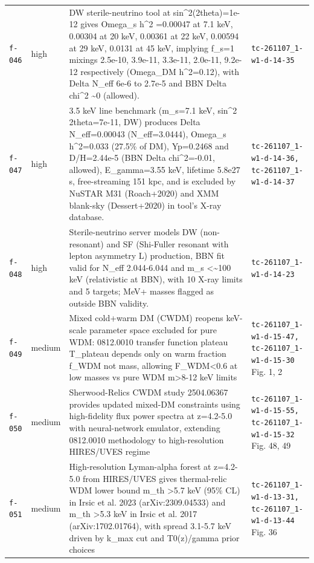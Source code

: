 \documentclass[11pt,a4paper]{article}
\begin{document}
\begin{longtable}{@{}p{}p{}p{}p{}@{}}
\texttt{f-046} & high & DW sterile-neutrino tool at sin\textasciicircum{}2(2theta)=1e-12 gives Omega\_s h\textasciicircum{}2 =0.00047 at 7.1 keV, 0.00304 at 20 keV, 0.00361 at 22 keV, 0.00594 at 29 keV, 0.0131 at 45 keV, implying f\_s=1 mixings 2.5e-10, 3.9e-11, 3.3e-11, 2.0e-11, 9.2e-12 respectively (Omega\_DM h\textasciicircum{}2=0.12), with Delta N\_eff 6e-6 to 2.7e-5 and BBN Delta chi\textasciicircum{}2 \textasciitilde{}0 (allowed). & \texttt{tc-261107\_\allowbreak{}1-w1-d-14-35} \\
\texttt{f-047} & high & 3.5 keV line benchmark (m\_s=7.1 keV, sin\textasciicircum{}2 2theta=7e-11, DW) produces Delta N\_eff=0.00043 (N\_eff=3.0444), Omega\_s h\textasciicircum{}2=0.033 (27.5\% of DM), Yp=0.2468 and D/H=2.44e-5 (BBN Delta chi\textasciicircum{}2=-0.01, allowed), E\_gamma=3.55 keV, lifetime 5.8e27 s, free-streaming 151 kpc, and is excluded by NuSTAR M31 (Roach+2020) and XMM blank-sky (Dessert+2020) in tool's X-ray database. & \texttt{tc-261107\_\allowbreak{}1-w1-d-14-36,\allowbreak{} tc-261107\_\allowbreak{}1-w1-d-14-37} \\
\texttt{f-048} & high & Sterile-neutrino server models DW (non-resonant) and SF (Shi-Fuller resonant with lepton asymmetry L) production, BBN fit valid for N\_eff 2.044-6.044 and m\_s \textless{}\textasciitilde{}100 keV (relativistic at BBN), with 10 X-ray limits and 5 targets; MeV+ masses flagged as outside BBN validity. & \texttt{tc-261107\_\allowbreak{}1-w1-d-14-23} \\
\texttt{f-049} & medium & Mixed cold+warm DM (CWDM) reopens keV-scale parameter space excluded for pure WDM: 0812.0010 transfer function plateau T\_plateau depends only on warm fraction f\_WDM not mass, allowing F\_WDM\textless{}0.6 at low masses vs pure WDM m\textgreater{}8-12 keV limits & \texttt{tc-261107\_\allowbreak{}1-w1-d-15-47,\allowbreak{} tc-261107\_\allowbreak{}1-w1-d-15-30} Fig. 1, 2 \\
\texttt{f-050} & medium & Sherwood-Relics CWDM study 2504.06367 provides updated mixed-DM constraints using high-fidelity flux power spectra at z=4.2-5.0 with neural-network emulator, extending 0812.0010 methodology to high-resolution HIRES/UVES regime & \texttt{tc-261107\_\allowbreak{}1-w1-d-15-55,\allowbreak{} tc-261107\_\allowbreak{}1-w1-d-15-32} Fig. 48, 49 \\
\texttt{f-051} & medium & High-resolution Lyman-alpha forest at z=4.2-5.0 from HIRES/UVES gives thermal-relic WDM lower bound m\_th \textgreater{}5.7 keV (95\% CL) in Irsic et al. 2023 (arXiv:2309.04533) and m\_th \textgreater{}5.3 keV in Irsic et al. 2017 (arXiv:1702.01764), with spread 3.1-5.7 keV driven by k\_max cut and T0(z)/gamma prior choices & \texttt{tc-261107\_\allowbreak{}1-w1-d-13-31,\allowbreak{} tc-261107\_\allowbreak{}1-w1-d-13-44} Fig. 36 \\

\end{longtable}
\end{document}
